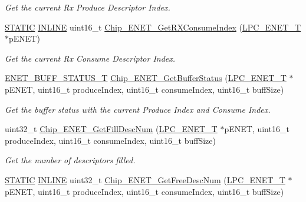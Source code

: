 \begin{DoxyCompactItemize}
\begin{DoxyCompactList}\small\item\em Get the current Rx Produce Descriptor Index. \end{DoxyCompactList}\item 
\hyperlink{group__LPC__Types__Public__Macros_ga10b2d890d871e1489bb02b7e70d9bdfb}{S\-T\-A\-T\-I\-C} \hyperlink{group__LPC__Types__Public__Types_ga2eb6f9e0395b47b8d5e3eeae4fe0c116}{I\-N\-L\-I\-N\-E} uint16\-\_\-t \hyperlink{group__ENET__17XX__40XX_gae79ff7cdffb9e43c95fb309ca7c16aa2}{Chip\-\_\-\-E\-N\-E\-T\-\_\-\-Get\-R\-X\-Consume\-Index} (\hyperlink{structLPC__ENET__T}{L\-P\-C\-\_\-\-E\-N\-E\-T\-\_\-\-T} $\ast$p\-E\-N\-E\-T)
\begin{DoxyCompactList}\small\item\em Get the current Rx Consume Descriptor Index. \end{DoxyCompactList}\item 
\hyperlink{group__ENET__17XX__40XX_gab29d71439401a8d4f68643acfd10959b}{E\-N\-E\-T\-\_\-\-B\-U\-F\-F\-\_\-\-S\-T\-A\-T\-U\-S\-\_\-\-T} \hyperlink{group__ENET__17XX__40XX_gafed5419d7a6be4580641e557429a63ad}{Chip\-\_\-\-E\-N\-E\-T\-\_\-\-Get\-Buffer\-Status} (\hyperlink{structLPC__ENET__T}{L\-P\-C\-\_\-\-E\-N\-E\-T\-\_\-\-T} $\ast$p\-E\-N\-E\-T, uint16\-\_\-t produce\-Index, uint16\-\_\-t consume\-Index, uint16\-\_\-t buff\-Size)
\begin{DoxyCompactList}\small\item\em Get the buffer status with the current Produce Index and Consume Index. \end{DoxyCompactList}\item 
uint32\-\_\-t \hyperlink{group__ENET__17XX__40XX_gac5f44f20f55847c4c9b9906f051aeca3}{Chip\-\_\-\-E\-N\-E\-T\-\_\-\-Get\-Fill\-Desc\-Num} (\hyperlink{structLPC__ENET__T}{L\-P\-C\-\_\-\-E\-N\-E\-T\-\_\-\-T} $\ast$p\-E\-N\-E\-T, uint16\-\_\-t produce\-Index, uint16\-\_\-t consume\-Index, uint16\-\_\-t buff\-Size)
\begin{DoxyCompactList}\small\item\em Get the number of descriptors filled. \end{DoxyCompactList}\item 
\hyperlink{group__LPC__Types__Public__Macros_ga10b2d890d871e1489bb02b7e70d9bdfb}{S\-T\-A\-T\-I\-C} \hyperlink{group__LPC__Types__Public__Types_ga2eb6f9e0395b47b8d5e3eeae4fe0c116}{I\-N\-L\-I\-N\-E} uint32\-\_\-t \hyperlink{group__ENET__17XX__40XX_ga4d0afde7abd542590c1bb53fba4d90b1}{Chip\-\_\-\-E\-N\-E\-T\-\_\-\-Get\-Free\-Desc\-Num} (\hyperlink{structLPC__ENET__T}{L\-P\-C\-\_\-\-E\-N\-E\-T\-\_\-\-T} $\ast$p\-E\-N\-E\-T, uint16\-\_\-t produce\-Index, uint16\-\_\-t consume\-Index, uint16\-\_\-t buff\-Size)

\end{DoxyCompactItemize}
